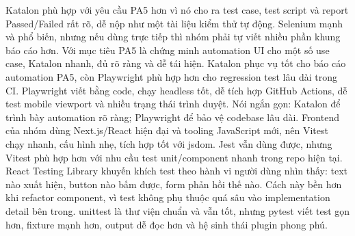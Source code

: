 {}
\markdownRendererSectionEnd 
\markdownRendererSectionEnd \markdownRendererSectionBegin
{}\markdownRendererInterblockSeparator
{}\markdownRendererSectionBegin
{}\markdownRendererInterblockSeparator
{}Katalon phù hợp với yêu cầu PA5 hơn vì nó cho ra test case, test script và report Passed/Failed rất rõ, dễ nộp như một tài liệu kiểm thử tự động.\markdownRendererParagraphSeparator
{}Selenium mạnh và phổ biến, nhưng nếu dùng trực tiếp thì nhóm phải tự viết nhiều phần khung báo cáo hơn. Với mục tiêu PA5 là chứng minh automation UI cho một số use case, Katalon nhanh, đủ rõ ràng và dễ tái hiện.\markdownRendererInterblockSeparator
{}
\markdownRendererSectionEnd \markdownRendererSectionBegin
{}\markdownRendererInterblockSeparator
{}Katalon phục vụ tốt cho báo cáo automation PA5, còn Playwright phù hợp hơn cho regression test lâu dài trong CI.\markdownRendererParagraphSeparator
{}Playwright viết bằng code, chạy headless tốt, dễ tích hợp GitHub Actions, dễ test mobile viewport và nhiều trạng thái trình duyệt.\markdownRendererParagraphSeparator
{}Nói ngắn gọn: Katalon để trình bày automation rõ ràng; Playwright để bảo vệ codebase lâu dài.\markdownRendererInterblockSeparator
{}
\markdownRendererSectionEnd \markdownRendererSectionBegin
{}\markdownRendererInterblockSeparator
{}Frontend của nhóm dùng Next.js/React hiện đại và tooling JavaScript mới, nên Vitest chạy nhanh, cấu hình nhẹ, tích hợp tốt với jsdom.\markdownRendererParagraphSeparator
{}Jest vẫn dùng được, nhưng Vitest phù hợp hơn với nhu cầu test unit/component nhanh trong repo hiện tại.\markdownRendererInterblockSeparator
{}
\markdownRendererSectionEnd \markdownRendererSectionBegin
{}\markdownRendererInterblockSeparator
{}React Testing Library khuyến khích test theo hành vi người dùng nhìn thấy: text nào xuất hiện, button nào bấm được, form phản hồi thế nào.\markdownRendererParagraphSeparator
{}Cách này bền hơn khi refactor component, vì test không phụ thuộc quá sâu vào implementation detail bên trong.\markdownRendererInterblockSeparator
{}
\markdownRendererSectionEnd \markdownRendererSectionBegin
{}\markdownRendererInterblockSeparator
{}unittest là thư viện chuẩn và vẫn tốt, nhưng pytest viết test gọn hơn, fixture mạnh hơn, output dễ đọc hơn và hệ sinh thái plugin phong phú.\markdownRendererParagraphSeparator
